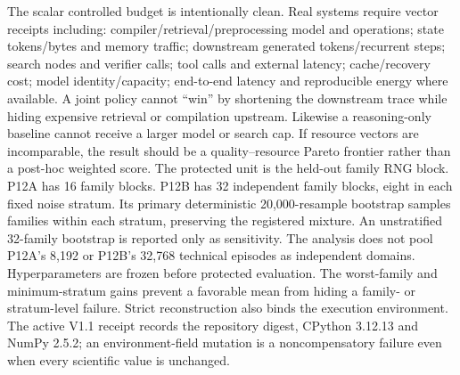 \markdownRendererDocumentBegin
\markdownRendererSectionBegin
{}\markdownRendererInterblockSeparator
{}The scalar controlled budget is intentionally clean. Real systems require vector receipts including:\markdownRendererInterblockSeparator
{}\markdownRendererUlBeginTight
\markdownRendererUlItem compiler/retrieval/preprocessing model and operations;\markdownRendererUlItemEnd 
\markdownRendererUlItem state tokens/bytes and memory traffic;\markdownRendererUlItemEnd 
\markdownRendererUlItem downstream generated tokens/recurrent steps;\markdownRendererUlItemEnd 
\markdownRendererUlItem search nodes and verifier calls;\markdownRendererUlItemEnd 
\markdownRendererUlItem tool calls and external latency;\markdownRendererUlItemEnd 
\markdownRendererUlItem cache/recovery cost;\markdownRendererUlItemEnd 
\markdownRendererUlItem model identity/capacity;\markdownRendererUlItemEnd 
\markdownRendererUlItem end-to-end latency and reproducible energy where available.\markdownRendererUlItemEnd 
\markdownRendererUlEndTight \markdownRendererInterblockSeparator
{}A joint policy cannot “win” by shortening the downstream trace while hiding expensive retrieval or compilation upstream. Likewise a reasoning-only baseline cannot receive a larger model or search cap. If resource vectors are incomparable, the result should be a quality–resource Pareto frontier rather than a post-hoc weighted score.\markdownRendererInterblockSeparator
{}\markdownRendererSectionBegin
{}\markdownRendererInterblockSeparator
{}The protected unit is the held-out family RNG block. P12A has 16 family blocks. P12B has 32 independent family blocks, eight in each fixed noise stratum. Its primary deterministic 20,000-resample bootstrap samples families within each stratum, preserving the registered mixture. An unstratified 32-family bootstrap is reported only as sensitivity.\markdownRendererInterblockSeparator
{}The analysis does not pool P12A's 8,192 or P12B's 32,768 technical episodes as independent domains. Hyperparameters are frozen before protected evaluation. The worst-family and minimum-stratum gains prevent a favorable mean from hiding a family- or stratum-level failure.\markdownRendererInterblockSeparator
{}Strict reconstruction also binds the execution environment. The active V1.1 receipt records the repository  digest, CPython 3.12.13 and NumPy 2.5.2; an environment-field mutation is a noncompensatory failure even when every scientific value is unchanged.
\markdownRendererSectionEnd 
\markdownRendererSectionEnd \markdownRendererDocumentEnd
